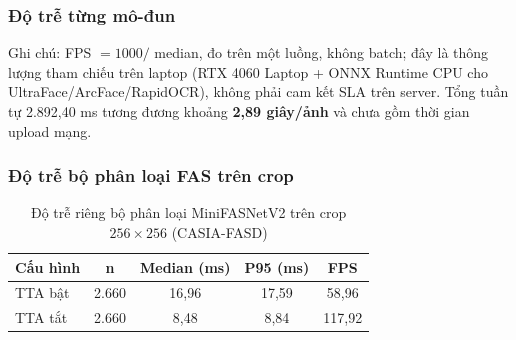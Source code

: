 \documentclass[12pt,a4paper]{article}
\begin{document}
\subsubsection{Độ trễ từng mô-đun}
\begin{table}[H]
  \centering
  \caption{Độ trễ và thông lượng từng mô-đun trên 200 ảnh FantasyID test (đo một luồng)}
  \label{tab:latency}
  \footnotesize
\end{table}
Ghi chú: FPS $= 1000 /$ median, đo trên một luồng, không batch; đây là thông lượng tham chiếu trên
laptop (RTX 4060 Laptop + ONNX Runtime CPU cho UltraFace/ArcFace/RapidOCR), không phải cam kết SLA
trên server. Tổng tuần tự 2.892,40 ms tương đương khoảng \textbf{2,89 giây/ảnh} và chưa gồm thời gian
upload mạng.

\subsubsection{Độ trễ bộ phân loại FAS trên crop}
\begin{table}[H]
  \centering
  \caption{Độ trễ riêng bộ phân loại MiniFASNetV2 trên crop $256\times256$ (CASIA-FASD)}
  \label{tab:fas-latency}
  \small
  \begin{tabular}{@{}lcccc@{}}
    \toprule
    \textbf{Cấu hình} & \textbf{n} & \textbf{Median (ms)} & \textbf{P95 (ms)} & \textbf{FPS}\\
    \midrule
    TTA bật & 2.660 & 16,96 & 17,59 & 58,96\\
    TTA tắt & 2.660 & 8,48 & 8,84 & 117,92\\
    \bottomrule
  \end{tabular}
\end{table}
\end{document}
